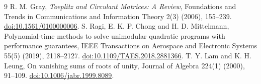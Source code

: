 \documentclass[11pt,a4paper]{article}
\begin{document}
\begin{thebibliography}{9}
 R. M. Gray, \emph{Toeplitz and Circulant Matrices: A Review},
Foundations and Trends in Communications and Information Theory 2(3)
(2006), 155--239. \href{https://doi.org/10.1561/0100000006}{doi:10.1561/0100000006}.
 S. Ragi, E. K. P. Chong and H. D. Mittelmann,
Polynomial-time methods to solve unimodular quadratic programs with performance
guarantees, IEEE Transactions on Aerospace and Electronic Systems 55(5)
(2019), 2118--2127. \href{https://doi.org/10.1109/TAES.2018.2881366}{doi:10.1109/TAES.2018.2881366}.
 T. Y. Lam and K. H. Leung,
On vanishing sums of roots of unity, Journal of Algebra 224(1)
(2000), 91--109.
\href{https://doi.org/10.1006/jabr.1999.8089}{doi:10.1006/jabr.1999.8089}.
\end{thebibliography}
\end{document}
